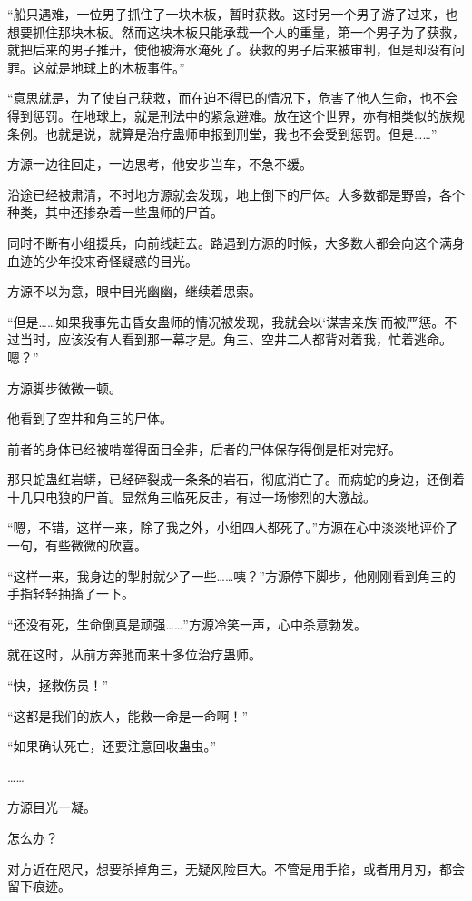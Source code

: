 \begin{this_body}
“船只遇难，一位男子抓住了一块木板，暂时获救。这时另一个男子游了过来，也想要抓住那块木板。然而这块木板只能承载一个人的重量，第一个男子为了获救，就把后来的男子推开，使他被海水淹死了。获救的男子后来被审判，但是却没有问罪。这就是地球上的木板事件。”

“意思就是，为了使自己获救，而在迫不得已的情况下，危害了他人生命，也不会得到惩罚。在地球上，就是刑法中的紧急避难。放在这个世界，亦有相类似的族规条例。也就是说，就算是治疗蛊师申报到刑堂，我也不会受到惩罚。但是……”

方源一边往回走，一边思考，他安步当车，不急不缓。

沿途已经被肃清，不时地方源就会发现，地上倒下的尸体。大多数都是野兽，各个种类，其中还掺杂着一些蛊师的尸首。

同时不断有小组援兵，向前线赶去。路遇到方源的时候，大多数人都会向这个满身血迹的少年投来奇怪疑惑的目光。

方源不以为意，眼中目光幽幽，继续着思索。

“但是……如果我事先击昏女蛊师的情况被发现，我就会以‘谋害亲族’而被严惩。不过当时，应该没有人看到那一幕才是。角三、空井二人都背对着我，忙着逃命。嗯？”

方源脚步微微一顿。

他看到了空井和角三的尸体。

前者的身体已经被啃噬得面目全非，后者的尸体保存得倒是相对完好。

那只蛇蛊红岩蟒，已经碎裂成一条条的岩石，彻底消亡了。而病蛇的身边，还倒着十几只电狼的尸首。显然角三临死反击，有过一场惨烈的大激战。

“嗯，不错，这样一来，除了我之外，小组四人都死了。”方源在心中淡淡地评价了一句，有些微微的欣喜。

“这样一来，我身边的掣肘就少了一些……咦？”方源停下脚步，他刚刚看到角三的手指轻轻抽搐了一下。

“还没有死，生命倒真是顽强……”方源冷笑一声，心中杀意勃发。

就在这时，从前方奔驰而来十多位治疗蛊师。

“快，拯救伤员！”

“这都是我们的族人，能救一命是一命啊！”

“如果确认死亡，还要注意回收蛊虫。”

……

方源目光一凝。

怎么办？

对方近在咫尺，想要杀掉角三，无疑风险巨大。不管是用手掐，或者用月刃，都会留下痕迹。


\end{this_body}
